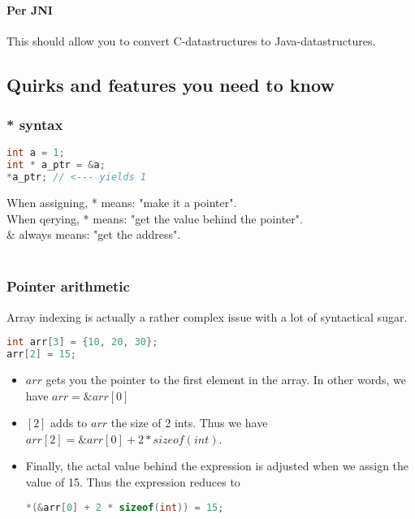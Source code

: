 \paragraph{Per JNI}
This should allow you to convert C-datastructures to Java-datastructures.




\subsection{Quirks and features you need to know}

\subsubsection{* syntax}

\begin{lstlisting}[language=c]
int a = 1; 
int * a_ptr = &a;
*a_ptr; // <--- yields 1
\end{lstlisting}

When assigning, * means: "make it a pointer". \\
When qerying, * means: "get the value behind the pointer". \\
\& always means: "get the address". \\ \\



\subsubsection{Pointer arithmetic}

Array indexing is actually a rather complex issue with a lot of syntactical sugar.

\begin{lstlisting}[language=c]
int arr[3] = {10, 20, 30};
arr[2] = 15;
\end{lstlisting}

\begin{itemize}
    \item $arr$ gets you the pointer to the first element in the array. In other words, we have $arr = \&arr[0]$
    \item $[2]$ adds to $arr$ the size of 2 ints. Thus we have $arr[2] = \&arr[0] + 2 * sizeof(int)$.
    \item Finally, the actal value behind the expression is adjusted when we assign the value of 15. Thus the expression reduces to 
            \begin{lstlisting}[language=c]
                *(&arr[0] + 2 * sizeof(int)) = 15;
            \end{lstlisting}
\end{itemize}


